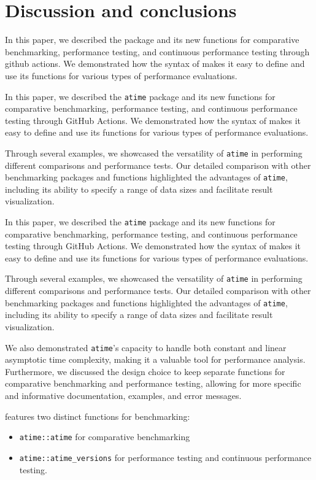 \section{Discussion and conclusions}


In this paper, we described the  package and its new functions for comparative benchmarking, performance testing, and continuous performance testing through github actions. We demonstrated how the syntax of  makes it easy to define and use its functions for various types of performance evaluations.

In this paper, we described the \texttt{atime} package and its new functions for comparative benchmarking, performance testing, and continuous performance testing through GitHub Actions. We demonstrated how the syntax of  makes it easy to define and use its functions for various types of performance evaluations.


Through several examples, we showcased the versatility of \texttt{atime} in performing different comparisons and performance tests. Our detailed comparison with other benchmarking packages and functions highlighted the advantages of \texttt{atime}, including its ability to specify a range of data sizes and facilitate result visualization.


In this paper, we described the \texttt{atime} package and its new functions for comparative benchmarking, performance testing, and continuous performance testing through GitHub Actions. We demonstrated how the syntax of  makes it easy to define and use its functions for various types of performance evaluations.

Through several examples, we showcased the versatility of \texttt{atime} in performing different comparisons and performance tests. Our detailed comparison with other benchmarking packages and functions highlighted the advantages of \texttt{atime}, including its ability to specify a range of data sizes and facilitate result visualization.


We also demonstrated \texttt{atime}'s capacity to handle both constant and linear asymptotic time complexity, making it a valuable tool for performance analysis. Furthermore, we discussed the design choice to keep separate functions for comparative benchmarking and performance testing, allowing for more specific and informative documentation, examples, and error messages.

 features two distinct functions for benchmarking: 
\begin{itemize}
 
    \item\texttt{atime::atime} for comparative benchmarking \item\texttt{atime::atime\_versions} for performance testing and continuous performance testing. 

\end{itemize}

